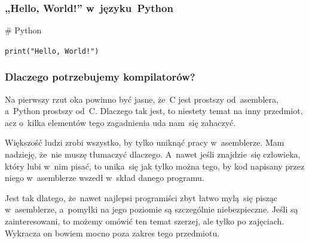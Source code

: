 \documentclass[10pt,t]{beamer}
\begin{document}
\begin{frame}
  \frametitle{„Hello, World!” w~języku~Python}


  \# Python

  \texttt{print("Hello, World!")}

\end{frame}




\begin{frame}
  \frametitle{Dlaczego potrzebujemy kompilatorów?}


  Na pierwszy rzut oka powinno być jasne, że~C jest prostszy od~asemblera,
  a~Python prostszy od~C. Dlaczego tak jest, to niestety temat na inny
  przedmiot, acz o~kilka elementów tego zagadnienia uda nam~się zahaczyć.

  Większość ludzi zrobi wszystko, by tylko uniknąć pracy w~asemblerze.
  Mam nadzieję, że~nie muszę tłumaczyć dlaczego.  A~nawet jeśli
  znajdzie~się człowieka, który lubi w~nim pisać, to unika~się jak tylko
  można tego, by kod napisany przez niego w~asemblerze wszedł w~skład
  danego programu.

  Jest tak dlatego, że~nawet najlepsi programiści zbyt łatwo mylą~się
  pisząc w~asemblerze, a~pomyłki na jego poziomie są szczególnie
  niebezpieczne. Jeśli są zainteresowani, to możemy omówić ten temat
  szerzej, ale tylko po zajęciach. Wykracza on bowiem mocno poza zakres tego
  przedmiotu.

\end{frame}
\end{document}
